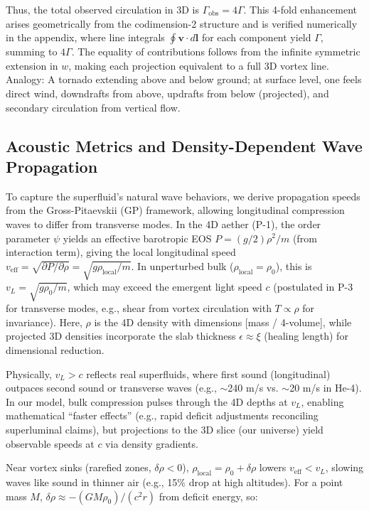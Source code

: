 \documentclass{article}
\begin{document}
Thus, the total observed circulation in 3D is $\Gamma_{\text{obs}} = 4\Gamma$. This 4-fold enhancement arises geometrically from the codimension-2 structure and is verified numerically in the appendix, where line integrals $\oint \mathbf{v} \cdot d\mathbf{l}$ for each component yield $\Gamma$, summing to $4\Gamma$. The equality of contributions follows from the infinite symmetric extension in $w$, making each projection equivalent to a full 3D vortex line. Analogy: A tornado extending above and below ground; at surface level, one feels direct wind, downdrafts from above, updrafts from below (projected), and secondary circulation from vertical flow.

\subsection{Acoustic Metrics and Density-Dependent Wave Propagation}

To capture the superfluid's natural wave behaviors, we derive propagation speeds from the Gross-Pitaevskii (GP) framework, allowing longitudinal compression waves to differ from transverse modes. In the 4D aether (P-1), the order parameter $\psi$ yields an effective barotropic EOS $P = (g / 2) \rho^2 / m$ (from interaction term), giving the local longitudinal speed $v_{\text{eff}} = \sqrt{\partial P / \partial \rho} = \sqrt{g \rho_{\text{local}} / m}$. In unperturbed bulk ($\rho_{\text{local}} = \rho_0$), this is $v_L = \sqrt{g \rho_0 / m}$, which may exceed the emergent light speed $c$ (postulated in P-3 for transverse modes, e.g., shear from vortex circulation with $T \propto \rho$ for invariance). Here, $\rho$ is the 4D density with dimensions [mass / 4-volume], while projected 3D densities incorporate the slab thickness $\epsilon \approx \xi$ (healing length) for dimensional reduction.

Physically, $v_L > c$ reflects real superfluids, where first sound (longitudinal) outpaces second sound or transverse waves (e.g., $\sim$240 m/s vs. $\sim$20 m/s in He-4). In our model, bulk compression pulses through the 4D depths at $v_L$, enabling mathematical ``faster effects'' (e.g., rapid deficit adjustments reconciling superluminal claims), but projections to the 3D slice (our universe) yield observable speeds at $c$ via density gradients.

Near vortex sinks (rarefied zones, $\delta \rho < 0$), $\rho_{\text{local}} = \rho_0 + \delta \rho$ lowers $v_{\text{eff}} < v_L$, slowing waves like sound in thinner air (e.g., 15\% drop at high altitudes). For a point mass $M$, $\delta \rho \approx - (G M \rho_0) / (c^2 r)$ from deficit energy, so:
\end{document}
